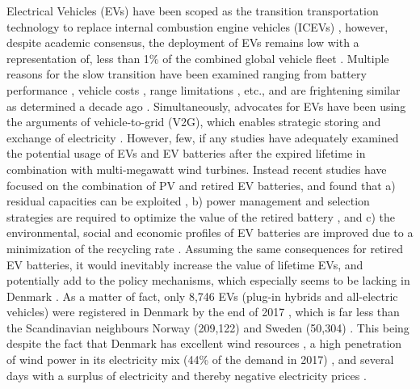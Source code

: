 Electrical Vehicles (EVs) have been scoped as the transition transportation technology to replace internal combustion engine vehicles (ICEVs) \cite{Kester2018PromotingDiffusion, Ajanovic2018ElectricProblem}, however, despite academic consensus, the deployment of EVs remains low with a representation of, less than 1\% of the combined global vehicle fleet \cite{InternationalEnergyAgencyIEA2017GlobalCounting}. Multiple reasons for the slow transition have been examined ranging from battery performance \cite{Ajanovic2018ElectricProblem}, vehicle costs \cite{Sovacool2017TheAgenda}, range limitations \cite{Noel2019FearAnxiety}, etc., and are frightening similar as determined a decade ago \cite{Sovacool2009BeyondTransition}. Simultaneously, advocates for EVs have been using the arguments of vehicle-to-grid (V2G), which enables strategic storing and exchange of electricity \cite{Sovacool2017TheAgenda}. However, few, if any studies have adequately examined the potential usage of EVs and EV batteries after the expired lifetime in combination with multi-megawatt wind turbines. Instead recent studies have focused on the combination of PV and retired EV batteries, and found that a) residual capacities can be exploited \cite{HUANG201980}, b) power management and selection strategies are required to optimize the value of the retired battery \cite{8279474}, and c) the environmental, social and economic profiles of EV batteries are improved due to a minimization of the recycling rate \cite{TANG20194304}. Assuming the same consequences for retired EV batteries, it 
would inevitably increase the value of lifetime EVs, and potentially add to the policy mechanisms, which especially seems to be lacking in Denmark \cite{Kester2018PromotingDiffusion}. As a matter of fact, only  8,746 EVs (plug-in hybrids and all-electric vehicles) were registered in Denmark by the end of 2017 \cite{Bilimp}, which is far less than the Scandinavian neighbours Norway (209,122)  \cite{Elbil} and Sweden (50,304) \cite{BilSweden}. This being despite the fact that Denmark has excellent wind resources \cite{Enevoldsen2016OnshoreRisks},  a high penetration of wind power in its electricity mix (44\% of the demand in 2017) \cite{Pineda2018}, and several days with a surplus of electricity and thereby negative electricity prices \cite{Hou2017OptimizingDenmark}.

